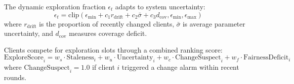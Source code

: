 \documentclass[conference]{IEEEtran}
\begin{document}
The dynamic exploration fraction $\epsilon_t$ adapts to system uncertainty:
\begin{equation}
\epsilon_t = \text{clip}\left(\epsilon_{\min} + c_1 r_{\text{drift}} + c_2 \bar{\sigma} + c_3 d_{\text{cov}}, \epsilon_{\min}, \epsilon_{\max}\right)
\end{equation}
where $r_{\text{drift}}$ is the proportion of recently changed clients, $\bar{\sigma}$ is average parameter uncertainty, and $d_{\text{cov}}$ measures coverage deficit.

Clients compete for exploration slots through a combined ranking score:
\begin{equation}
\text{ExploreScore}_i = w_s \cdot \text{Staleness}_i + w_u \cdot \text{Uncertainty}_i + w_c \cdot \text{ChangeSuspect}_i + w_f \cdot \text{FairnessDeficit}_i
\end{equation}
where $\text{ChangeSuspect}_i = 1.0$ if client $i$ triggered a change alarm within recent rounds.
\end{document}
